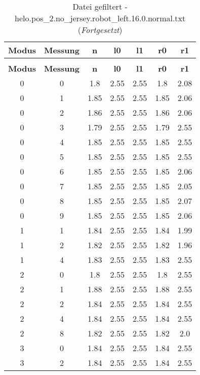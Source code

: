 \clearpage{}
\begin{longtable}{|c|c||c||c|c||c|c|}
	\caption{Datei gefiltert - helo.pos\_2.no\_jersey.robot\_left.16.0.normal.txt} \label{tab:helo.pos-2.no-jersey.robot-left.16.0.normal.txt} \\ \hline
	\textbf{Modus} & \textbf{Messung} & \textbf{n} & \textbf{l0} & \textbf{l1} & \textbf{r0} & \textbf{r1}\\ \hline
	\endfirsthead
	\caption[]{Datei gefiltert - helo.pos\_2.no\_jersey.robot\_left.16.0.normal.txt (\emph{Fortgesetzt})} \\ \hline
	\textbf{Modus} & \textbf{Messung} & \textbf{n} & \textbf{l0} & \textbf{l1} & \textbf{r0} & \textbf{r1}\\ \hline
	\endhead
	0 & 0 & 1.8 & 2.55 & 2.55 & 1.8 & 2.08 \\ \hline
	0 & 1 & 1.85 & 2.55 & 2.55 & 1.85 & 2.06 \\ \hline
	0 & 2 & 1.86 & 2.55 & 2.55 & 1.86 & 2.06 \\ \hline
	0 & 3 & 1.79 & 2.55 & 2.55 & 1.79 & 2.55 \\ \hline
	0 & 4 & 1.85 & 2.55 & 2.55 & 1.85 & 2.55 \\ \hline
	0 & 5 & 1.85 & 2.55 & 2.55 & 1.85 & 2.55 \\ \hline
	0 & 6 & 1.85 & 2.55 & 2.55 & 1.85 & 2.06 \\ \hline
	0 & 7 & 1.85 & 2.55 & 2.55 & 1.85 & 2.05 \\ \hline
	0 & 8 & 1.85 & 2.55 & 2.55 & 1.85 & 2.07 \\ \hline
	0 & 9 & 1.85 & 2.55 & 2.55 & 1.85 & 2.06 \\ \hline
	1 & 1 & 1.84 & 2.55 & 2.55 & 1.84 & 1.99 \\ \hline
	1 & 2 & 1.82 & 2.55 & 2.55 & 1.82 & 1.96 \\ \hline
	1 & 4 & 1.83 & 2.55 & 2.55 & 1.83 & 2.55 \\ \hline
	2 & 0 & 1.8 & 2.55 & 2.55 & 1.8 & 2.55 \\ \hline
	2 & 1 & 1.88 & 2.55 & 2.55 & 1.88 & 2.55 \\ \hline
	2 & 2 & 1.84 & 2.55 & 2.55 & 1.84 & 2.55 \\ \hline
	2 & 4 & 1.84 & 2.55 & 2.55 & 1.84 & 2.55 \\ \hline
	2 & 8 & 1.82 & 2.55 & 2.55 & 1.82 & 2.0 \\ \hline
	3 & 0 & 1.84 & 2.55 & 2.55 & 1.84 & 2.55 \\ \hline
	3 & 2 & 1.84 & 2.55 & 2.55 & 1.84 & 2.55 \\ \hline

\end{longtable}
